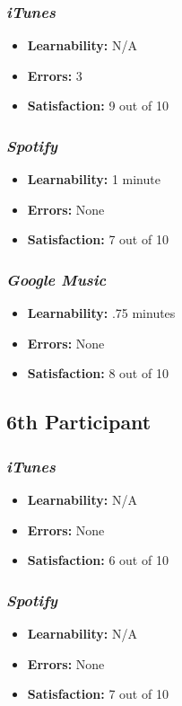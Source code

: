 \documentclass{article}
\begin{document}
{\begin{multicols}{2}
\subsubsection{\it iTunes}
\begin{itemize}
	\item {\bf Learnability:} N/A
	\item {\bf Errors:}  3
	\item {\bf Satisfaction:} 9 out of 10 
\end{itemize}

\subsubsection{\it Spotify}
\begin{itemize}
	\item {\bf Learnability:} 1 minute
	\item {\bf Errors:} None
	\item {\bf Satisfaction:} 7 out of 10 
\end{itemize}

\subsubsection{\it Google Music}
\begin{itemize}
\item {\bf Learnability:} .75 minutes
	\item {\bf Errors:} None
	\item {\bf Satisfaction:} 8 out of 10 
\end{itemize}

\subsection{6th Participant}

\subsubsection{\it iTunes}
\begin{itemize}
	\item {\bf Learnability:} N/A
	\item {\bf Errors:}  None
	\item {\bf Satisfaction:} 6 out of 10 
\end{itemize}

\subsubsection{\it Spotify}
\begin{itemize}
	\item {\bf Learnability:} N/A
	\item {\bf Errors:} None
	\item {\bf Satisfaction:} 7 out of 10 
\end{itemize}


\end{multicols}}
\end{document}
